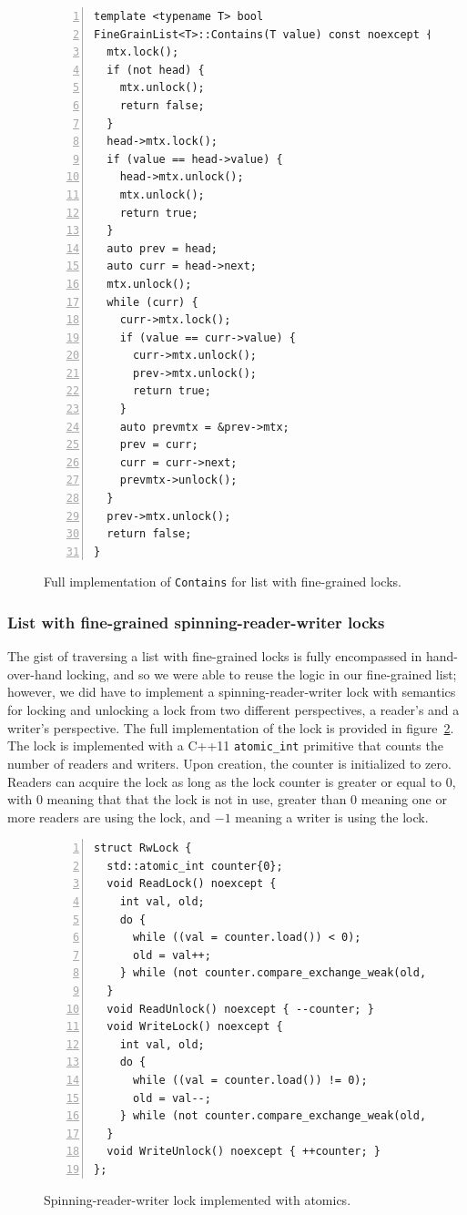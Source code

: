 \documentclass[11pt]{article}
\begin{document}
\begin{figure}[h]
\begin{center}
\begin{lstlisting}[numbers=left]
template <typename T> bool
FineGrainList<T>::Contains(T value) const noexcept {
  mtx.lock();
  if (not head) {
    mtx.unlock();
    return false;
  }
  head->mtx.lock();
  if (value == head->value) {
    head->mtx.unlock();
    mtx.unlock();
    return true;
  }
  auto prev = head;
  auto curr = head->next;
  mtx.unlock();
  while (curr) {
    curr->mtx.lock();
    if (value == curr->value) {
      curr->mtx.unlock();
      prev->mtx.unlock();
      return true;
    }
    auto prevmtx = &prev->mtx;
    prev = curr;
    curr = curr->next;
    prevmtx->unlock();
  }
  prev->mtx.unlock();
  return false;
}
\end{lstlisting}
\caption{
Full implementation of {\tt Contains} for list with fine-grained locks.}
\label{fig:finegrain}
\end{center}
\end{figure}

\subsubsection{List with fine-grained spinning-reader-writer locks}
The gist of traversing a list with fine-grained locks is fully encompassed in
hand-over-hand locking, and so we were able to reuse the logic in our
fine-grained list; however, we did have to implement a spinning-reader-writer
lock with semantics for locking and unlocking a lock from two different
perspectives, a reader's and a writer's perspective. The full implementation of
the lock is provided in figure~\ref{fig:rwlock}. The lock is implemented with a
C++11 {\tt atomic\_int} primitive that counts the number of readers and writers.
Upon creation, the counter is initialized to zero. Readers can acquire the lock
as long as the lock counter is greater or equal to $0$, with $0$ meaning that
that the lock is not in use, greater than $0$ meaning one or more readers are
using the lock, and $-1$ meaning a writer is using the lock.

\begin{figure}[h]
\begin{center}
\begin{lstlisting}[numbers=left]
struct RwLock {
  std::atomic_int counter{0};
  void ReadLock() noexcept {
    int val, old;
    do {
      while ((val = counter.load()) < 0);
      old = val++;
    } while (not counter.compare_exchange_weak(old, val));
  }
  void ReadUnlock() noexcept { --counter; }
  void WriteLock() noexcept {
    int val, old;
    do {
      while ((val = counter.load()) != 0);
      old = val--;
    } while (not counter.compare_exchange_weak(old, val));
  }
  void WriteUnlock() noexcept { ++counter; }
};
\end{lstlisting}
\caption{Spinning-reader-writer lock implemented with atomics.}
\label{fig:rwlock}
\end{center}
\end{figure}
\end{document}
